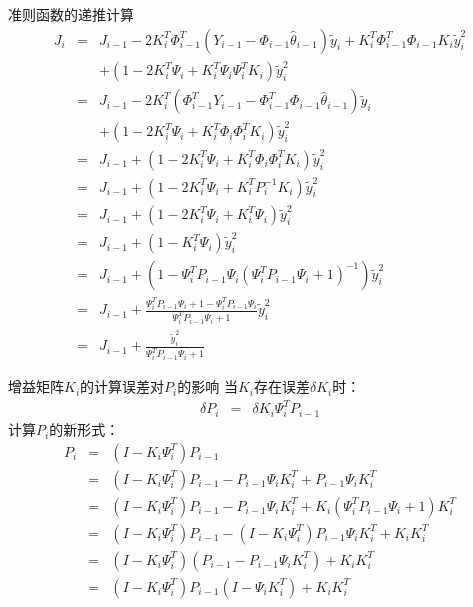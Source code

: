 \begin{frame}{准则函数的递推计算}
\begin{eqnarray*}
J_i &=& J_{i-1} - 2 K_i^T\Phi_{i-1}^T(Y_{i-1}-\Phi_{i-1}\hat\theta_{i-1})\tilde y_i + K_i^T \Phi_{i-1}^T\Phi_{i-1} K_i \tilde y_i^2  \\
&& +(1-2K_i^T\Psi_i+K_i^T\Psi_i\Psi_i^T K_i)\tilde y_i^2   \\
&=& J_{i-1} - 2 K_i^T(\Phi_{i-1}^TY_{i-1}-\Phi_{i-1}^T\Phi_{i-1}\hat\theta_{i-1})\tilde y_i  \\
&&  +(1-2K_i^T\Psi_i+K_i^T\Phi_i\Phi_i^T K_i)\tilde y_i^2   \\
&=& J_{i-1}  +  (1-2K_i^T\Psi_i+K_i^T\Phi_i\Phi_i^T K_i)\tilde y_i^2   \\
&=& J_{i-1}  +  (1-2K_i^T\Psi_i+K_i^T P_i^{-1} K_i)\tilde y_i^2   \\
&=& J_{i-1}  +  (1-2K_i^T\Psi_i+K_i^T \Psi_i)\tilde y_i^2   \\
&=& J_{i-1}  +  (1-K_i^T\Psi_i)\tilde y_i^2   \\
&=& J_{i-1}  +  (1-\Psi_i^T P_{i-1} \Psi_i(\Psi_i^T P_{i-1} \Psi_i+1)^{-1}) \tilde y_i^2 \\
&=& J_{i-1}  +  \frac{\Psi_i^T P_{i-1} \Psi_i+1-\Psi_i^T P_{i-1} \Psi_i}{\Psi_i^T P_{i-1} \Psi_i+1} \tilde y_i^2 \\
&=& J_{i-1}  +  \frac{\tilde y_i^2}{\Psi_i^T P_{i-1} \Psi_i+1}  
\end{eqnarray*}
\end{frame}
\begin{frame}{增益矩阵$K_i$的计算误差对$P_i$的影响}
当$K_i$存在误差$\delta K_i$时：
\begin{eqnarray*}
\delta P_i &=& \delta K_i \Psi_i^T P_{i-1}
\end{eqnarray*}
计算$P_i$的新形式：
\begin{eqnarray*}
P_i &=& (I-K_i\Psi_i^T)P_{i-1}  \\
&=& (I-K_i\Psi_i^T)P_{i-1} -P_{i-1}\Psi_i K_i^T+P_{i-1}\Psi_i K_i^T \\
&=& (I-K_i\Psi_i^T)P_{i-1} -P_{i-1}\Psi_i K_i^T+K_i(\Psi_i^T P_{i-1}\Psi_i+1)K_i^T \\
&=& (I-K_i\Psi_i^T)P_{i-1} -(I-K_i\Psi_i^T)P_{i-1}\Psi_i K_i^T+K_i K_i^T \\
&=& (I-K_i\Psi_i^T)(P_{i-1} -P_{i-1}\Psi_i K_i^T)+K_i K_i^T \\
&=& (I-K_i\Psi_i^T)P_{i-1} (I-\Psi_i K_i^T)+K_i K_i^T 
\end{eqnarray*}
\end{frame}

